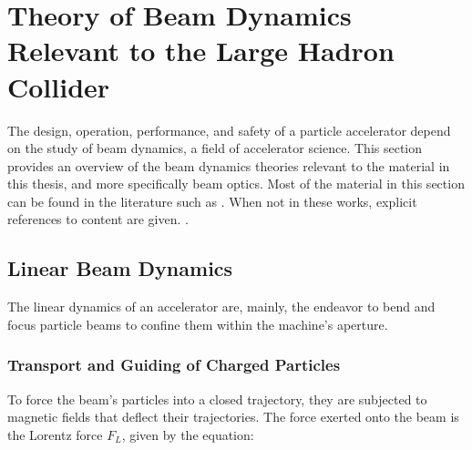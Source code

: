 \chapter{Theory of Beam Dynamics Relevant to the Large Hadron Collider}

\label{Chapter:Theory} %


The design, operation, performance, and safety of a particle accelerator depend on the study of beam dynamics, a field of accelerator science.
This section provides an overview of the beam dynamics theories relevant to the material in this thesis, and more specifically beam optics.
Most of the material in this section can be found in the literature such as \cite{BOOK:Wilson:Introcution_Particle_Accelerators, BOOK:Lee:Accelerator_physics, BOOK:Wiedemann:Particle_Accelerator_Physics, BOOK:Minty:Measurements_Control_Charged_Particle_Beams,BOOK:Wolski:Beam_dynamics,BOOK:Chao:Handbook_Accelerator_Physics_Engineering, BOOK:Chao:Collective_instabilities}.
When not in these works, explicit references to content are given.
.


\section{Linear Beam Dynamics}

The linear dynamics of an accelerator are, mainly, the endeavor to bend and focus particle beams to confine them within the machine's aperture.

\subsection{Transport and Guiding of Charged Particles}

To force the beam's particles into a closed trajectory, they are subjected to magnetic fields that deflect their trajectories.
The force exerted onto the beam is the Lorentz force \(F_{L}\), given by the equation:

